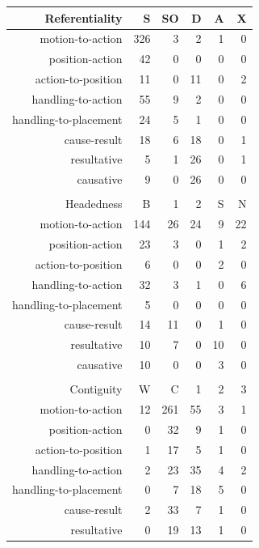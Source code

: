\begin{table}\small
\centering
\begin{tabular}{rrrrrr}
  \lsptoprule
Referentiality & S & SO & D & A & X \\ 
  \midrule
  motion-to-action & 326 &   3 &   2 &   1 &   0 \\ 
  position-action &  42 &   0 &   0 &   0 &   0 \\ 
  action-to-position &  11 &   0 &  11 &   0 &   2 \\ 
  handling-to-action &  55 &   9 &   2 &   0 &   0 \\ 
  handling-to-placement &  24 &   5 &   1 &   0 &   0 \\ 
  cause-result &  18 &   6 &  18 &   0 &   1 \\ 
  resultative &   5 &   1 &  26 &   0 &   1 \\ 
  causative &   9 &   0 &  26 &   0 &   0 \\ 
   \midrule
 \\
  \midrule
Headedness & B & 1 & 2 & S & N \\ 
  \midrule
  motion-to-action & 144 &  26 &  24 &   9 &  22 \\ 
  position-action &  23 &   3 &   0 &   1 &   2 \\ 
  action-to-position &   6 &   0 &   0 &   2 &   0 \\ 
  handling-to-action &  32 &   3 &   1 &   0 &   6 \\ 
  handling-to-placement &   5 &   0 &   0 &   0 &   0 \\ 
  cause-result &  14 &  11 &   0 &   1 &   0 \\ 
  resultative &  10 &   7 &   0 &  10 &   0 \\ 
  causative &  10 &   0 &   0 &   3 &   0 \\ 
   \midrule
 \\
  \midrule
Contiguity & W & C & 1 & 2 & 3 \\ 
  \midrule
  motion-to-action &  12 & 261 &  55 &   3 &   1 \\ 
  position-action &   0 &  32 &   9 &   1 &   0 \\ 
  action-to-position &   1 &  17 &   5 &   1 &   0 \\ 
  handling-to-action &   2 &  23 &  35 &   4 &   2 \\ 
  handling-to-placement &   0 &   7 &  18 &   5 &   0 \\ 
  cause-result &   2 &  33 &   7 &   1 &   0 \\ 
  resultative &   0 &  19 &  13 &   1 &   0 \\ 

\end{tabular}
\end{table}
